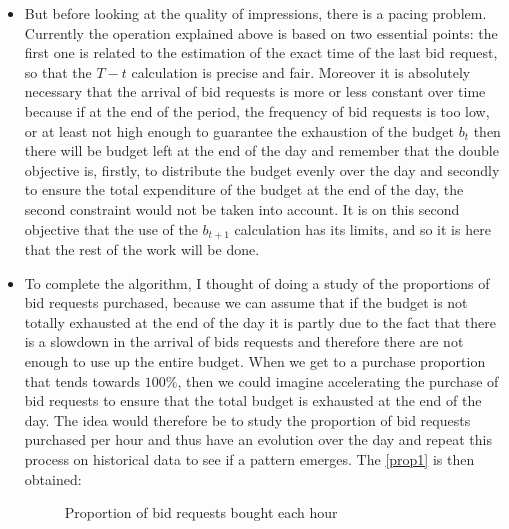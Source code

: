 \documentclass[12pt]{article}
\begin{document}
\begin{itemize}
\item But before looking at the quality of impressions, there is a pacing problem. Currently the operation explained above is based on two essential points: the first one is related to the estimation of the exact time of the last bid request, so that the $T-t$ calculation is precise and fair. Moreover it is absolutely necessary that the arrival of bid requests is more or less constant over time because if at the end of the period, the frequency of bid requests is too low, or at least not high enough to guarantee the exhaustion of the budget $b_t$ then there will be budget left at the end of the day and remember that the double objective is, firstly, to distribute the budget evenly over the day and secondly to ensure the total expenditure of the budget at the end of the day, the second constraint would not be taken into account. It is on this second objective that the use of the $b_{t+1}$ calculation has its limits, and so it is here that the rest of the work will be done.
\item To complete the algorithm, I thought of doing a study of the proportions of bid requests purchased, because we can assume that if the budget is not totally exhausted at the end of the day it is partly due to the fact that there is a slowdown in the arrival of bids requests and therefore there are not enough to use up the entire budget. When we get to a purchase proportion that tends towards $100\%$, then we could imagine accelerating the purchase of bid requests to ensure that the total budget is exhausted at the end of the day. The idea would therefore be to study the proportion of bid requests purchased per hour and thus have an evolution over the day and repeat this process on historical data to see if a pattern emerges. The \autoref{prop1} is then obtained:

\begin{figure}[h!]
	\centering
	\caption{Proportion of bid requests bought each hour}
	\label{prop1}
\end{figure}


\end{itemize}
\end{document}
